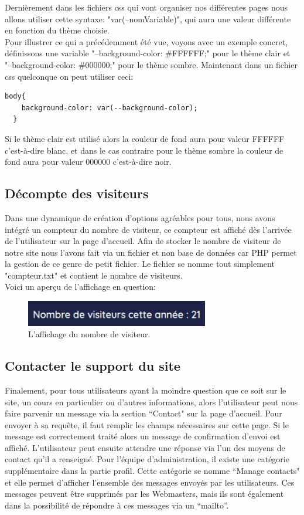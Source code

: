 \documentclass[a4paper,11pt]{article}
\begin{document}
Dernièrement dans les fichiers css qui vont organiser nos différentes pages nous allons utiliser cette syntaxe: "var(--nomVariable)", qui aura une valeur différente en fonction du thème choisie.\\

Pour illustrer ce qui a précédemment été vue, voyons avec un exemple concret, définissons une variable "--background-color: \#FFFFFF;" pour le thème clair et "--background-color: \#000000;" pour le thème sombre. Maintenant dans un fichier css quelconque on peut utiliser ceci:
\begin{lstlisting}[language=HTML]
  body{
    background-color: var(--background-color);
  }
\end{lstlisting}
Si le thème clair est utilisé alors la couleur de fond aura pour valeur FFFFFF c'est-à-dire blanc, et dans le cas contraire pour le thème sombre la couleur de fond aura pour valeur 000000 c'est-à-dire noir.

\subsection{Décompte des visiteurs}
Dans une dynamique de création d'options agréables pour tous, nous avons intégré un compteur du nombre de visiteur, ce compteur est affiché dès l'arrivée de l'utilisateur sur la page d'accueil. Afin de stocker le nombre de visiteur de notre site nous l'avons fait via un fichier et non base de données car PHP permet la gestion de ce genre de petit fichier. Le fichier se nomme tout simplement "compteur.txt" et contient le nombre de visiteurs.\\
Voici un aperçu de l'affichage en question: 
\begin{figure}[!h]
\centerline{\includegraphics[width=8cm]{images/numberVisiteurs.PNG}}
\caption{L'affichage du nombre de visiteur.}
\label{fig}
\end{figure}

\subsection{Contacter le support du site}
Finalement, pour tous utilisateurs ayant la moindre question que ce soit sur le site, un cours en particulier ou d'autres informations, alors l'utilisateur peut nous faire parvenir un message via la section ``Contact" sur la page d'accueil. Pour envoyer à sa requête, il faut remplir les champs nécessaires sur cette page. Si le message est correctement traité alors un message de confirmation d'envoi est affiché. L'utilisateur peut ensuite attendre une réponse via l'un des moyens de contact qu'il a renseigné. Pour l'équipe d'administration, il existe une catégorie supplémentaire dans la partie profil. Cette catégorie se nomme ``Manage contacts" et elle permet d'afficher l'ensemble des messages envoyés par les utilisateurs. Ces messages peuvent être supprimés par les Webmasters, mais ils sont également dans la possibilité de répondre à ces messages via un ``mailto''.\\
\end{document}
